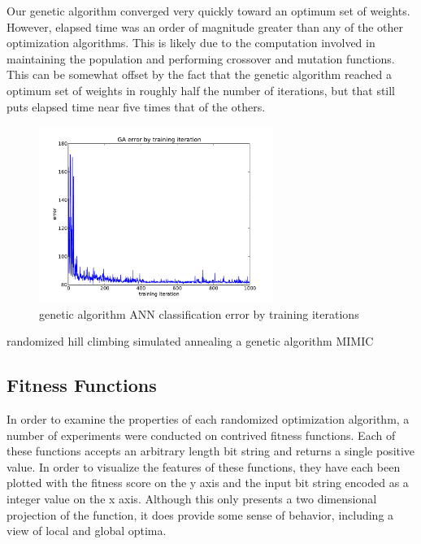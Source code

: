\documentclass{sig-alternate}
\begin{document}
Our genetic algorithm converged very quickly toward an optimum set of weights. However, elapsed time was an order of magnitude greater than any of the other optimization algorithms. This is likely due to the computation involved in maintaining the population and performing crossover and mutation functions. This can be somewhat offset by the fact that the genetic algorithm reached a optimum set of weights in roughly half the number of iterations, but that still puts elapsed time near five times that of the others.

\begin{figure}[!htbp]
    \centering
    \includegraphics[width=3in]{part1.1/error-ga.pdf}
    \caption{genetic algorithm ANN classification error by training iterations \label{error-ga}}
\end{figure} 


randomized hill climbing
simulated annealing
a genetic algorithm
MIMIC


\subsection{Fitness Functions}

In order to examine the properties of each randomized optimization algorithm, a number of experiments were conducted on contrived fitness functions. Each of these functions accepts an arbitrary length bit string and returns a single positive value. In order to visualize the features of these functions, they have each been plotted with the fitness score on the y axis and the input bit string encoded as a integer value on the x axis. Although this only presents a two dimensional projection of the function, it does provide some sense of behavior, including a view of local and global optima. 
\end{document}
